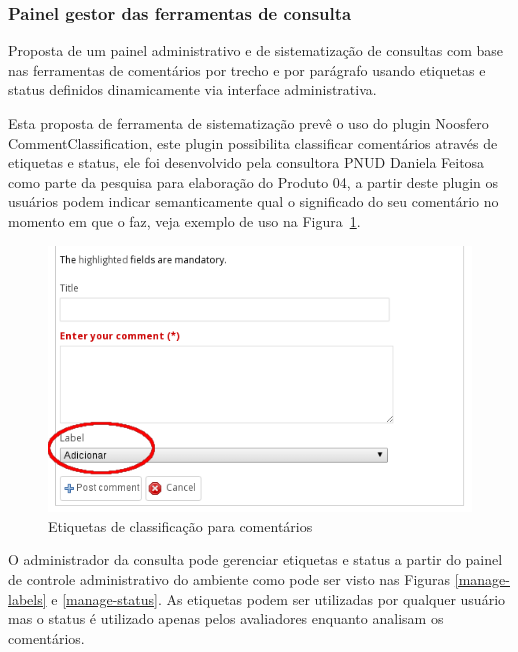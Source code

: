 \documentclass[12pt]{article}
\begin{document}
\subsubsection{Painel gestor das ferramentas de consulta}

Proposta de um painel administrativo e de sistematização de consultas com base
nas ferramentas de comentários por trecho e por parágrafo usando etiquetas e
status definidos dinamicamente via interface administrativa.

Esta proposta de ferramenta de sistematização prevê o uso do plugin Noosfero
CommentClassification\cite{commentClassificationPlugin}, este plugin
possibilita classificar comentários através de etiquetas e status, ele foi
desenvolvido pela consultora PNUD Daniela Feitosa como
parte da pesquisa para elaboração do Produto 04, a partir
deste plugin os usuários podem indicar semanticamente qual o significado do
seu comentário no momento em que o faz, veja exemplo de uso na
Figura~\ref{etiqueta}.

\begin{figure}[h]
\center
\includegraphics[scale=0.5]{etiqueta.png}
\caption{Etiquetas de classificação para comentários}
\label{etiqueta}
\end{figure}

O administrador da consulta pode gerenciar etiquetas e status a partir do
painel de controle administrativo do ambiente como pode ser visto nas
Figuras \ref{manage-labels} e \ref{manage-status}. As etiquetas podem ser
utilizadas por qualquer usuário mas o status é utilizado
apenas pelos avaliadores enquanto analisam os comentários.

\end{document}
